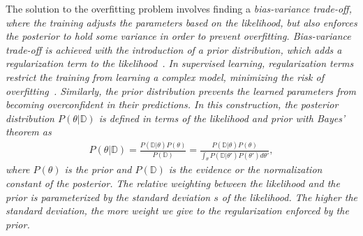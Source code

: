 The solution to the overfitting problem involves finding a \it{bias-variance
trade-off}\normalfont, where the training adjusts the parameters based on the
likelihood, but also enforces the posterior to hold some variance in order to
prevent overfitting.
%
%
Bias-variance trade-off is achieved with the introduction of a prior
distribution, which adds a regularization term to the
likelihood~\cite{bishop2006pattern}.
%
In supervised learning, regularization terms restrict the training from learning
a complex model, minimizing the risk of overfitting~\cite{santos2022avoiding}.
%
Similarly, the prior distribution prevents the learned parameters from becoming
\it{overconfident} \normalfont in their predictions.
%
In this construction, the posterior distribution $P(\theta | \mathbb{D})$ is
defined in terms of the likelihood and prior with Bayes' theorem as 
\begin{align}
  P(\theta | \mathbb{D}) = \frac{P(\mathbb{D} | \theta) P(\theta) }{P(\mathbb{D})}
  = \frac{P(\mathbb{D} | \theta) P(\theta) }{\int_\theta P(\mathbb{D} | \theta') P(\theta')  d\theta'}, 
  \label{eq:bayes_posterior}
\end{align}
where  $P(\theta)$ is the prior and $P(\mathbb{D})$ is the evidence or the
normalization constant of the posterior.
%
The relative weighting between the likelihood and the prior is parameterized by
the standard deviation $s$ of the likelihood. The higher the standard deviation,
the more weight we give to the regularization enforced by the prior.
